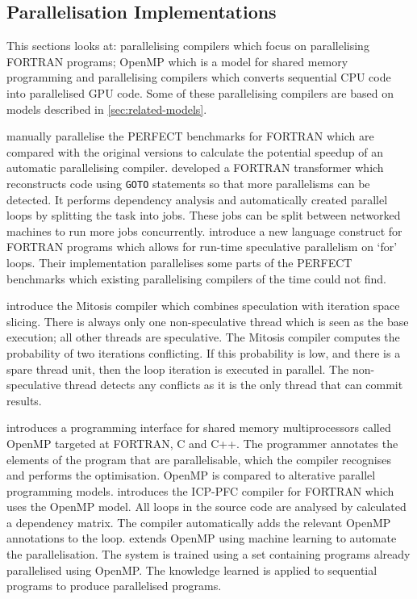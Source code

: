 \subsection{Parallelisation Implementations}
This sections looks at: parallelising compilers which focus on parallelising FORTRAN programs; OpenMP which is a model for shared memory programming and parallelising compilers which converts sequential CPU code into parallelised GPU code. Some of these parallelising compilers are based on models described in \autoref{sec:related-models}.

\textcite{Eigenmann1998} manually parallelise the PERFECT benchmarks for FORTRAN which are compared with the original versions to calculate the potential speedup of an automatic parallelising compiler.
\textcite{DHollander1998} developed a FORTRAN transformer which reconstructs code using \texttt{GOTO} statements so that more parallelisms can be detected. It performs dependency analysis and automatically created parallel loops by splitting the task into jobs. These jobs can be split between networked machines to run more jobs concurrently.
\textcite{Rauchwerger1999} introduce a new language construct for FORTRAN programs which allows for run-time speculative parallelism on `for' loops. Their implementation parallelises some parts of the PERFECT benchmarks which existing parallelising compilers of the time could not find.

\textcite{Quinones2005} introduce the Mitosis compiler which combines speculation with iteration space slicing. There is always only one non-speculative thread which is seen as the base execution; all other threads are speculative. The Mitosis compiler computes the probability of two iterations conflicting. If this probability is low, and there is a spare thread unit, then the loop iteration is executed in parallel. The non-speculative thread detects any conflicts as it is the only thread that can commit results.

\textcite{Dagum1998} introduces a programming interface for shared memory multiprocessors called OpenMP targeted at FORTRAN, C and C++. The programmer annotates the elements of the program that are parallelisable, which the compiler recognises and performs the optimisation. OpenMP is compared to alterative parallel programming models.
\textcite{Kim2000} introduces the ICP-PFC compiler for FORTRAN which uses the OpenMP model. All loops in the source code are analysed by calculated a dependency matrix. The compiler automatically adds the relevant OpenMP annotations to the loop.
\textcite{Lam2011} extends OpenMP using machine learning to automate the parallelisation. The system is trained using a set containing programs already parallelised using OpenMP. The knowledge learned is applied to sequential programs to produce parallelised programs.


